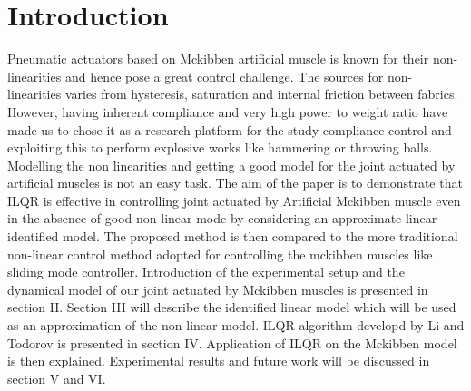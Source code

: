 \documentclass[conference]{IEEEtran}
\begin{document}
\section{Introduction}
Pneumatic actuators based on Mckibben artificial muscle is known for their non-linearities and hence pose a great control challenge. The sources for non-linearities varies from  hysteresis, saturation and internal friction between fabrics. However, having inherent compliance and very high power to weight ratio have made us to chose it as a research platform for the study compliance control and exploiting this to perform explosive works like hammering or throwing balls. Modelling the non linearities and getting a good model for the joint actuated by artificial muscles is not an easy task. The aim of the paper is to demonstrate that ILQR is effective in controlling joint actuated by Artificial Mckibben muscle even in the absence of good non-linear mode by considering an approximate linear identified model. The proposed method is then compared to the more traditional non-linear control method adopted for controlling the mckibben muscles like sliding mode controller. 
Introduction of the experimental setup and the dynamical model of our joint actuated by Mckibben muscles is presented in section II. Section III will describe the identified linear model which will be used as an approximation of the non-linear model. ILQR algorithm developd by Li and Todorov is presented in section IV. Application of ILQR on the Mckibben model is then explained. Experimental results and future work will be discussed in section V and VI.



%
%
\end{document}

